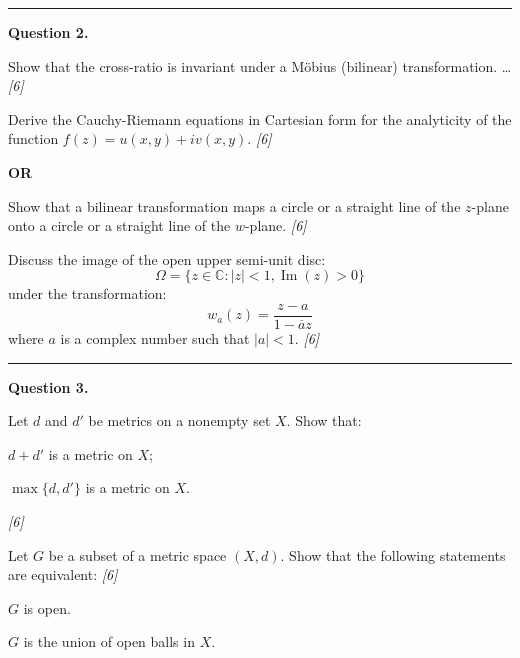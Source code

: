 \documentclass[11pt,a4paper]{article}
\newcommand{\pts}[1]{\hfill   \textit{[#1]}}
\begin{document}
\medskip\rule{\linewidth}{0.2pt}

\medskip


\noindent   \textbf{Question 2.}

\begin{parts}
  \item Show that the cross-ratio is invariant under a M\"{o}bius (bilinear) transformation. \dots\pts{6}
  \item Derive the Cauchy-Riemann equations in Cartesian form for the analyticity of the function $f(z) = u(x, y) + iv(x, y)$. \pts{6}
\end{parts}

\begin{center}
   \textbf{OR}
\end{center}

\begin{parts}
  \item Show that a bilinear transformation maps a circle or a straight line of the $z$-plane onto a circle or a straight line of the $w$-plane. \pts{6}
  \item Discuss the image of the open upper semi-unit disc:
  \[ \Omega = \{z \in \mathbb{C} : |z| < 1, \operatorname{Im}(z) > 0\} \]
  under the transformation:
  \[ w_a(z) = \frac{z - a}{1 - \overline{a}z} \]
  where $a$ is a complex number such that $|a| < 1$. \pts{6}
\end{parts}

\medskip\rule{\linewidth}{0.2pt}

\medskip


\noindent   \textbf{Question 3.}

\begin{parts}
  \item Let $d$ and $d'$ be metrics on a nonempty set $X$. Show that:
  
\begin{parts}
    \item $d + d'$ is a metric on $X$;
    \item $\max\{d, d'\}$ is a metric on $X$.
  \end{parts} \pts{6}
  \item Let $G$ be a subset of a metric space $(X,d)$. Show that the following statements are equivalent: \pts{6}
  
\begin{parts}
    \item $G$ is open.
    \item $G$ is the union of open balls in $X$.
  \end{parts}
\end{parts}
\end{document}
